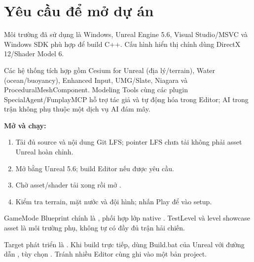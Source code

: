 \section{Yêu cầu để mở dự án}
Môi trường đã sử dụng là Windows, Unreal Engine 5.6, Visual Studio/MSVC và Windows SDK phù hợp để build C++. Cấu hình hiển thị chính dùng DirectX 12/Shader Model 6.

Các hệ thống tích hợp gồm Cesium for Unreal (địa lý/terrain), Water (ocean/buoyancy), Enhanced Input, UMG/Slate, Niagara và ProceduralMeshComponent. Modeling Tools cùng các plugin SpecialAgent/FunplayMCP hỗ trợ tác giả và tự động hóa trong Editor; AI trong trận không phụ thuộc một dịch vụ AI đám mây.

\textbf{Mở và chạy:}
\begin{enumerate}
 \item Tải đủ source và nội dung Git LFS; pointer LFS chưa tải không phải asset Unreal hoàn chỉnh.
 \item Mở  bằng Unreal 5.6; build Editor nếu được yêu cầu.
 \item Chờ asset/shader tải xong rồi mở .
 \item Kiểm tra terrain, mặt nước và đội hình; nhấn Play để vào setup.
\end{enumerate}
GameMode Blueprint chính là , phối hợp lớp native . TestLevel và level showcase asset là môi trường phụ, không tự có đầy đủ trận hải chiến.

Target phát triển là . Khi build trực tiếp, dùng Build.bat của Unreal với đường dẫn , tùy chọn . Tránh nhiều Editor cùng ghi vào một bản project.

